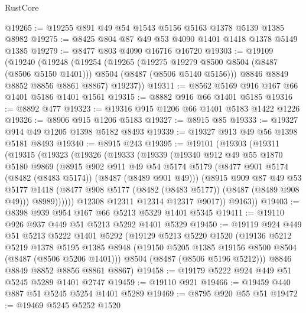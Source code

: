 \begin{lexlean}{RustCore}
\begin{coremodule}
@19265 := @19255 @891 @49 @54 @1543 @5156 @5163 @1378 @5139 @1385 @8982
@19275 := @8425 @804 @87 @49 @53 @4090 @1401 @1418 @1378 @5149 @1385
@19279 := @8477 @803 @4090 @16716 @16720
@19303 := @19109
    (@19240
      (@19248
        (@19254
          (@19265
            (@19275 @19279 @8500 @8504 (@8487 (@8506 @5150 @1401)))
            @8504
            (@8487 (@8506 @5140 @5156)))
          @8846
          @8849
          @8852
          @8856
          @8861
          @8867)
        @19237))
@19311 := @8562 @5169 @916 @167 @66 @1401 @5186 @1401 @1561
@19315 := @8882 @916 @66 @1401 @5185
@19316 := @8892 @477
@19323 := @19316 @915 @1206 @66 @1401 @5183 @1422 @1226
@19326 := @8906 @915 @1206 @5183
@19327 := @8915 @85
@19333 := @19327 @914 @49 @1205 @1398 @5182 @8493
@19339 := @19327 @913 @49 @56 @1398 @5181 @8493
@19340 := @8915 @243
@19395 := @19101
    (@19303
      (@19311
        (@19315
          (@19323
            (@19326
              (@19333
                (@19339
                  (@19340
                    @912
                    @49
                    @55
                    @1870
                    @5180
                    @9869
                    (@8915
                      @902
                      @911
                      @49
                      @54
                      @5174
                      @5179
                      (@8477 @901 @5174 (@8482 (@8483 @5174)) (@8487 (@8489 @901 @49)))
                      (@8915
                        @909
                        @87
                        @49
                        @53
                        @5177
                        @1418
                        (@8477 @908 @5177 (@8482 (@8483 @5177)) (@8487 (@8489 @908 @49)))
                        @8989))))))
            @12308
            @12311
            @12314
            @12317
            @9017))
        @9163))
@19403 := @8398 @939 @954 @167 @66 @5213 @5329 @1401 @5345
@19411 := @19110 @926 @937 @449 @51 @5213 @5292 @1401 @5329
@19450 := @19119
    @924
    @449
    @51
    @5213
    @5222
    @1401
    @5292
    (@19129
      @5213
      @5220
      @1520
      (@19136
        @5212
        @5219
        @1378
        @5195
        @1385
        @8948
        (@19150 @5205 @1385 @19156 @8500 @8504 (@8487 (@8506 @5206 @1401)))
        @8504
        (@8487 (@8506 @5196 @5212)))
      @8846
      @8849
      @8852
      @8856
      @8861
      @8867)
@19458 := @19179 @5222 @924 @449 @51 @5245 @5289 @1401 @2747
@19459 := @19110 @921
@19466 := @19459 @440 @887 @51 @5245 @5254 @1401 @5289
@19469 := @8795 @920 @55 @51
@19472 := @19469 @5245 @5252 @1520

\end{coremodule}
\end{lexlean}
